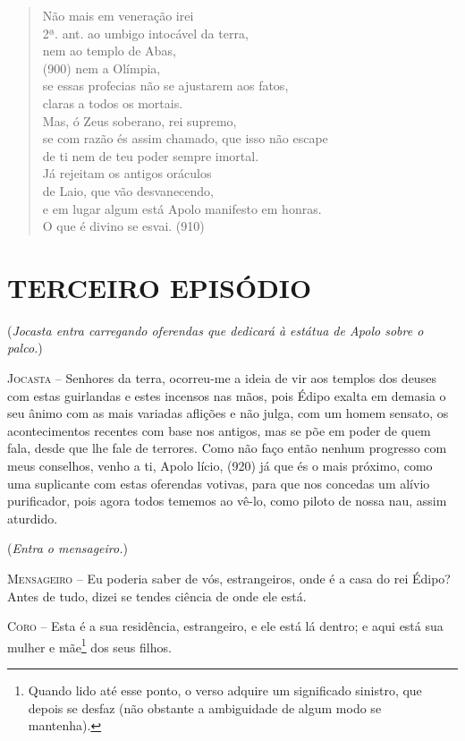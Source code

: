 \begin{verse}
Não mais em veneração irei\\ 2ª. ant.
ao umbigo intocável da terra,\\
nem ao templo de Abas,\\ (900)
nem a Olímpia,\\
se essas profecias não se ajustarem aos fatos,\\
claras a todos os mortais.\\
Mas, ó Zeus soberano, rei supremo,\\
se com razão és assim chamado, que isso não escape\\
de ti nem de teu poder sempre imortal.\\
Já rejeitam os antigos oráculos\\
de Laio, que vão desvanecendo,\\
e em lugar algum está Apolo manifesto em honras.\\
O que é divino se esvai. (910)
\end{verse}

\section{TERCEIRO EPISÓDIO}

(\emph{Jocasta entra carregando oferendas que dedicará à estátua de
Apolo sobre o palco.})

\textsc{Jocasta} --   Senhores da terra, ocorreu-me a ideia de vir aos templos dos deuses com
estas guirlandas e estes incensos nas mãos, pois Édipo exalta em demasia
o seu ânimo com as mais variadas aflições e não julga, com um homem
sensato, os acontecimentos recentes com base nos antigos, mas se põe em
poder de quem fala, desde que lhe fale de terrores. Como não faço então
nenhum progresso com meus conselhos, venho a ti, Apolo lício, (920) já
que és o mais próximo, como uma suplicante com estas oferendas votivas,
para que nos concedas um alívio purificador, pois agora todos tememos ao
vê-lo, como piloto de nossa nau, assim aturdido.

(\emph{Entra o mensageiro.})

\textsc{Mensageiro} --   Eu poderia saber de vós, estrangeiros, onde é a casa do rei Édipo? Antes
de tudo, dizei se tendes ciência de onde ele está.

\textsc{Coro} --   Esta é a sua residência, estrangeiro, e ele está lá dentro; e aqui está
sua mulher e mãe\footnote{Quando lido até esse ponto, o verso adquire um
  significado sinistro, que depois se desfaz (não obstante a ambiguidade
  de algum modo se mantenha).} dos seus filhos.

